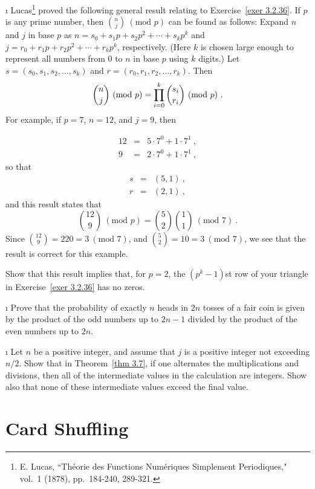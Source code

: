 \begin{LJSItem}
\i\label{exer 3.2.37} Lucas\footnote{E. Lucas, ``Th\'eorie des Functions
Num\'eriques Simplement Periodiques,"  vol.~1 (1878), pp.~184-240,
289-321.} proved the following general result relating  to Exercise~\ref{exer
3.2.36}.  If $p$ is any prime number, then ${n
\choose j}~ (\mbox{mod\ }p)$ can be found as follows: Expand $n$ and $j$ in base $p$ as
$n = s_0 + s_1p + s_2p^2 + \cdots + s_kp^k$ and $j = r_0 + r_1p + r_2p^2 + \cdots +
r_kp^k$, respectively.  (Here $k$ is chosen large enough to represent all numbers from
0 to $n$ in base $p$ using $k$ digits.)  Let $s = (s_0,s_1,s_2,\dots,s_k)$ and $r =
(r_0,r_1,r_2,\dots,r_k)$.  Then
$$
 {n \choose j}~(\mbox{mod\ }p) = \prod_{i = 0}^k   {{s_i} \choose {r_i}}~(\mbox{mod\
}p)\ .
$$ For example, if $p = 7$, $n = 12$, and $j = 9$, then

\begin{eqnarray*} 12 & = & 5 \cdot 7^0 + 1 \cdot 7^1\ , \\
 9 & = & 2 \cdot 7^0 + 1 \cdot 7^1\ , 
\end{eqnarray*} so that
\begin{eqnarray*} s & = & (5, 1)\ , \\ r & = & (2, 1)\ , 
\end{eqnarray*} and this result states that
$$ {12 \choose 9}~(\mbox{mod\ }p) = {5 \choose 2}  {1 \choose 1}~(\mbox{mod\ }7)\ .
$$ Since ${12 \choose 9} = 220 = 3~(\mbox{mod\ }7)$, and ${5 \choose 2} = 10 = 3~
(\mbox{mod\ }7)$,  we see that the result is correct for this example.

Show that this result implies that, for $p = 2$, the $(p^k - 1)$st row of your
triangle in Exercise~\ref{exer 3.2.36} has no zeros.

\i\label{exer 3.2.38} Prove that the probability of exactly $n$ heads in
$2n$ tosses of a fair coin is given by the product of the odd numbers up to $2n - 1$
divided by the product of the even numbers up to $2n$.

\i\label{exer 3.2.39} Let $n$ be a positive integer, and assume that $j$ is a
positive integer not exceeding $n/2$.  Show that in Theorem~\ref{thm 3.7},  if one
alternates the multiplications and divisions, then all of the intermediate  values in
the calculation are integers. Show also that none of these intermediate  values exceed
the final value.

\end{LJSItem}

\section{Card Shuffling}\label{sec 3.3} 

